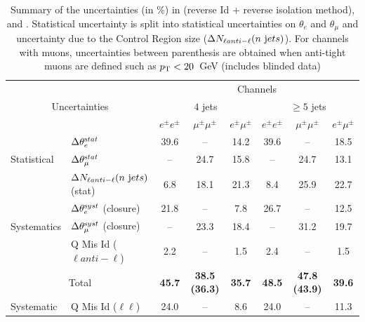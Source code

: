 \begin{table}[h!]
  \begin{center} 
{\small \begin{tabular}{|l|l|ccc|ccc|}
\hline \multicolumn{2}{|c|}{ } &  \multicolumn{6}{c|}{Channels} \\ \cline{3-8}
 \multicolumn{2}{|c|}{Uncertainties} &  \multicolumn{3}{c|}{$4$ jets} &  \multicolumn{3}{|c|}{$\ge 5$ jets} \\ \cline{3-8}
\multicolumn{2}{|c|}{} & $e^{\pm}e^{\pm}$ & $\mu^{\pm}\mu^{\pm}$ & $e^{\pm}\mu^{\pm}$ & $e^{\pm}e^{\pm}$ & $\mu^{\pm}\mu^{\pm}$ & $e^{\pm}\mu^{\pm}$  \\ \hline\hline

    &  $\Delta\theta_{e}^{\rm stat}$ & 39.6 & -- & 14.2 & 39.6 & -- & 18.5 \\ \cline{2-8}
   Statistical    &  $\Delta\theta_{\mu}^{\rm stat}$ & -- & 24.7 & 15.8 & -- & 24.7 & 13.1 \\ \cline{2-8}
    &  $\Delta N_{\ell anti-\ell}(n~ {\rm jets})$(stat) & 6.8 & 18.1 & 21.3 & 8.4 & 25.9 & 22.7 \\ \hline

    &  $\Delta\theta_{e}^{\rm syst}$ (closure) & 21.8 & -- & 7.8 & 26.7 & -- & 12.5 \\ \cline{2-8}
Systematics    &  $\Delta\theta_{\mu}^{\rm syst}$ (closure) & -- & 23.3 & 18.4 & -- & 31.2 & 19.7 \\ \cline{2-8}
    & Q Mis Id ($\ell anti-\ell$) & 2.2 & -- & 1.5 & 2.4 & -- & 1.5 \\ \hline

\multicolumn{2}{|c|}{Total} &\bf 45.7 &\bf 38.5 (36.3) &\bf 35.7 &\bf 48.5 &\bf 47.8 (43.9) &\bf 39.6 \\ \hline
Systematic    & Q Mis Id ($\ell\ell$) & 24.0 & -- & 8.6 & 24.0 & -- & 11.3 \\ \hline
\hline \end{tabular}}
\caption{ Summary of the uncertainties (in \%) in \ee (reverse Id + reverse isolation
  method), \mumu and \emu. Statistical uncertainty is split into statistical
  uncertainties on $\theta_{e}$ and $\theta_{\mu}$ and uncertainty due to the
  Control Region size ($\Delta N_{\ell anti-{\ell}}(n~ {\rm jets})$). For channels with muons, uncertainties
  between parenthesis are obtained when anti-tight muons are defined such as
  $p_{\rm T}<20$~GeV (includes blinded data) \label{tab:uncertainties}}
\end{center}  
 \end{table}


